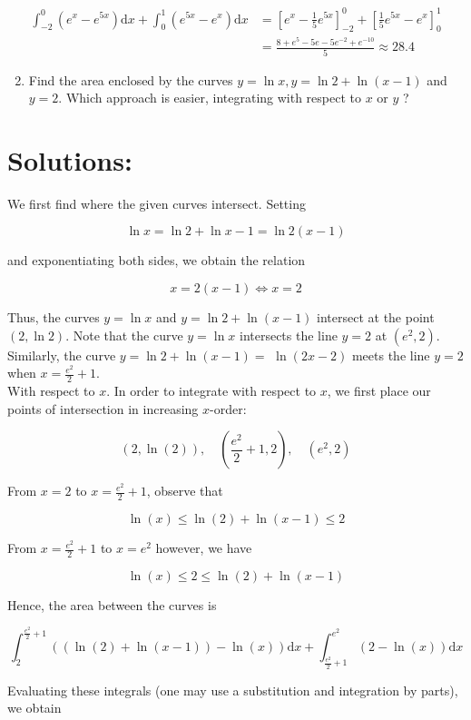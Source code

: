 \documentclass[10pt]{article}
\begin{document}
$$
\begin{aligned}
\int_{-2}^{0}\left(e^{x}-e^{5 x}\right) \mathrm{d} x+\int_{0}^{1}\left(e^{5 x}-e^{x}\right) \mathrm{d} x & =\left[e^{x}-\frac{1}{5} e^{5 x}\right]_{-2}^{0}+\left[\frac{1}{5} e^{5 x}-e^{x}\right]_{0}^{1} \\
& =\frac{8+e^{5}-5 e-5 e^{-2}+e^{-10}}{5} \approx 28.4
\end{aligned}
$$

\begin{enumerate}
  \setcounter{enumi}{1}
  \item Find the area enclosed by the curves $y=\ln x, y=\ln 2+\ln (x-1)$ and $y=2$. Which approach is easier, integrating with respect to $x$ or $y$ ?
\end{enumerate}

\section*{Solutions:}
We first find where the given curves intersect. Setting

$$
\ln x=\ln 2+\ln x-1=\ln 2(x-1)
$$

and exponentiating both sides, we obtain the relation

$$
x=2(x-1) \Longleftrightarrow x=2
$$

Thus, the curves $y=\ln x$ and $y=\ln 2+\ln (x-1)$ intersect at the point $(2, \ln 2)$. Note that the curve $y=\ln x$ intersects the line $y=2$ at $\left(e^{2}, 2\right)$. Similarly, the curve $y=\ln 2+\ln (x-1)=$ $\ln (2 x-2)$ meets the line $y=2$ when $x=\frac{e^{2}}{2}+1$.\\
With respect to $x$. In order to integrate with respect to $x$, we first place our points of intersection in increasing $x$-order:

$$
(2, \ln (2)), \quad\left(\frac{e^{2}}{2}+1,2\right), \quad\left(e^{2}, 2\right)
$$

From $x=2$ to $x=\frac{e^{2}}{2}+1$, observe that

$$
\ln (x) \leq \ln (2)+\ln (x-1) \leq 2
$$

From $x=\frac{e^{2}}{2}+1$ to $x=e^{2}$ however, we have

$$
\ln (x) \leq 2 \leq \ln (2)+\ln (x-1)
$$

Hence, the area between the curves is

$$
\int_{2}^{\frac{e^{2}}{2}+1}((\ln (2)+\ln (x-1))-\ln (x)) \mathrm{d} x+\int_{\frac{e^{2}}{2}+1}^{e^{2}}(2-\ln (x)) \mathrm{d} x
$$

Evaluating these integrals (one may use a substitution and integration by parts), we obtain
\end{document}
